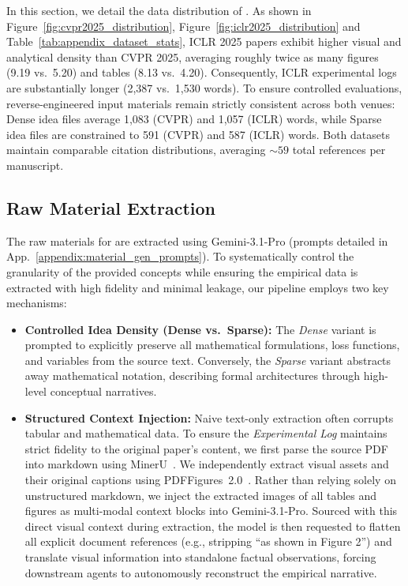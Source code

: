 


In this section, we detail the data distribution of \ourdataset{}. As shown in Figure~\ref{fig:cvpr2025_distribution}, Figure~\ref{fig:iclr2025_distribution} and Table~\ref{tab:appendix_dataset_stats}, ICLR 2025 papers exhibit higher visual and analytical density than CVPR 2025, averaging roughly twice as many figures (9.19 vs.\ 5.20) and tables (8.13 vs.\ 4.20). Consequently, ICLR experimental logs are substantially longer (2,387 vs.\ 1,530 words). To ensure controlled evaluations, reverse-engineered input materials remain strictly consistent across both venues: Dense idea files average 1,083 (CVPR) and 1,057 (ICLR) words, while Sparse idea files are constrained to 591 (CVPR) and 587 (ICLR) words. Both datasets maintain comparable citation distributions, averaging ${\sim}59$ total references per manuscript.

\subsection{Raw Material Extraction}
\label{appendix:raw_material_extraction}

The raw materials for \ourdataset{} are extracted using Gemini-3.1-Pro (prompts detailed in App.~\ref{appendix:material_gen_prompts}). To systematically control the granularity of the provided concepts while ensuring the empirical data is extracted with high fidelity and minimal leakage, our pipeline employs two key mechanisms:

\begin{itemize}
    \item \textbf{Controlled Idea Density (Dense vs.\ Sparse):} The \textit{Dense} variant is prompted to explicitly preserve all mathematical formulations, loss functions, and \mylatex{} variables from the source text. Conversely, the \textit{Sparse} variant abstracts away mathematical notation, describing formal architectures through high-level conceptual narratives.

    \item \textbf{Structured Context Injection:} Naive text-only extraction often corrupts tabular and mathematical data. To ensure the \textit{Experimental Log} maintains strict fidelity to the original paper's content, we first parse the source PDF into markdown using MinerU~\citep{wang2024mineruopensourcesolutionprecise}. We independently extract visual assets and their original captions using PDFFigures~2.0~\citep{pdffigures2}. Rather than relying solely on unstructured markdown, we inject the extracted images of all tables and figures as multi-modal context blocks into Gemini-3.1-Pro. Sourced with this direct visual context during extraction, the model is then requested to flatten all explicit document references (e.g., stripping ``as shown in Figure 2'') and translate visual information into standalone factual observations, forcing downstream agents to autonomously reconstruct the empirical narrative.
\end{itemize}

